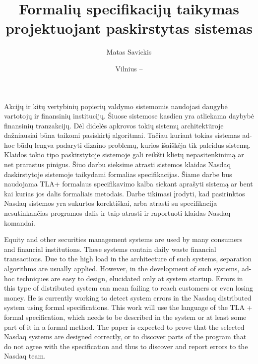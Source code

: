 \documentclass{VUMIFPSmagistrinis}
\title{Formalių specifikacijų taikymas projektuojant paskirstytas sistemas}
\author{Matas Savickis}
\date{Vilnius – \the\year}
\begin{document}
\maketitle


	Akcijų ir kitų vertybinių popierių valdymo sistemomis naudojasi daugybė vartotojų ir finansinių institucijų.
	Šiuose sistemose kasdien yra atliekama daybybė finansinių tranzakcijų.
	Dėl didelės apkrovos tokių sistemų architektūroje dažniausiai būna taikomi pasiskirtį algoritmai.
	Tačiau kuriant tokias sistemas ad-hoc būdų lengva padaryti dizaino problemų, kurios išaiškėja tik paleidus sistemą.
	Klaidos tokio tipo paskirstytoje sistemoje gali reikšti klietų nepasitenkinimą ar net prarastus pinigus.
	Šiuo darbu sieksime atrasti sistemos klaidas Nasdaq daskirstytoje sistemoje taikydami formalias specifikacijas.
	Šiame darbe bus naudojama TLA+ formalaus specifikavimo kalba siekant aprašyti sistemą ar bent kai kurias jos dalis formaliais metodais.
	Darbe tikimasi įrodyti, kad pasirinktos Nasdaq sistemos yra sukurtos korektiškai, arba atrasti su specifikacija nesutinkančias programos dalis ir taip atrasti ir raportuoti klaidas Nasdaq komandai.



Equity and other securities management systems are used by many consumers and financial institutions.
These systems contain daily waste financial transactions.
Due to the high load in the architecture of such systems, separation algorithms are usually applied.
However, in the development of such systems, ad-hoc techniques are easy to design, elucidated only at system startup.
Errors in this type of distributed system can mean failing to reach customers or even losing money.
He is currently working to detect system errors in the Nasdaq distributed system using formal specifications.
This work will use the language of the TLA + formal specification, which needs to be described in the system or at least some part of it in a formal method.
The paper is expected to prove that the selected Nasdaq systems are designed correctly, or to discover parts of the program that do not agree with the specification and thus to discover and report errors to the Nasdaq team.
\end{document}
